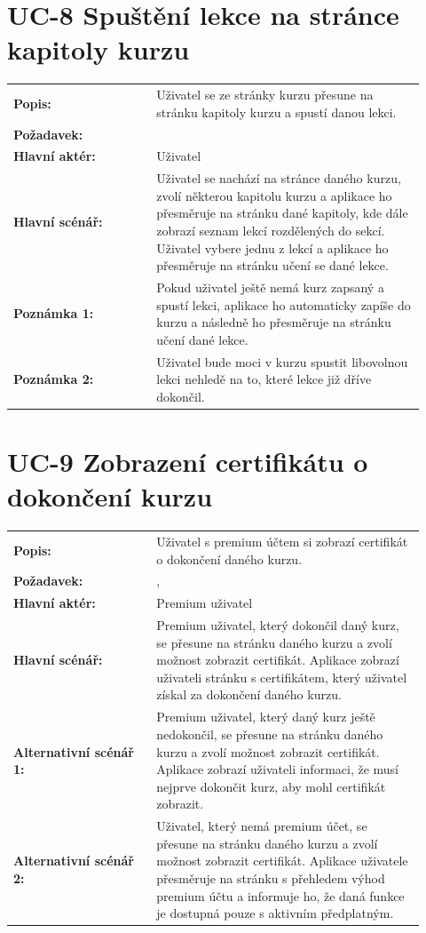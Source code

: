 \section{UC-8 Spuštění lekce na stránce kapitoly kurzu}\label{sec:uc-8}

\begin{tabular}{p{0.32\linewidth}p{0.6\linewidth}}
  \textbf{Popis:} & Uživatel se ze stránky kurzu přesune na stránku kapitoly kurzu a spustí danou lekci. \\
  \textbf{Požadavek:} & \nameref{sec:fp-course-chapter-page} \\
  \textbf{Hlavní aktér:} & Uživatel \\
  \textbf{Hlavní scénář:} & Uživatel se nachází na stránce daného kurzu, zvolí některou kapitolu kurzu a aplikace ho přesměruje na stránku dané kapitoly, kde dále zobrazí seznam lekcí rozdělených do sekcí. Uživatel vybere jednu z lekcí a aplikace ho přesměruje na stránku učení se dané lekce. \\
  \textbf{Poznámka 1:} & Pokud uživatel ještě nemá kurz zapsaný a spustí lekci, aplikace ho automaticky zapíše do kurzu a následně ho přesměruje na stránku učení dané lekce. \\
  \textbf{Poznámka 2:} & Uživatel bude moci v kurzu spustit libovolnou lekci nehledě na to, které lekce již dříve dokončil.
\end{tabular}

\section{UC-9 Zobrazení certifikátu o dokončení kurzu}\label{sec:uc-9}

\begin{tabular}{p{0.32\linewidth}p{0.6\linewidth}}
  \textbf{Popis:} & Uživatel s premium účtem si zobrazí certifikát o dokončení daného kurzu. \\
  \textbf{Požadavek:} & \nameref{sec:fp-course-certificate}, \nameref{sec:fp-subscription-system} \\
  \textbf{Hlavní aktér:} & Premium uživatel \\
  \textbf{Hlavní scénář:} & Premium uživatel, který dokončil daný kurz, se přesune na stránku daného kurzu a zvolí možnost zobrazit certifikát. Aplikace zobrazí uživateli stránku s certifikátem, který uživatel získal za dokončení daného kurzu. \\
  \textbf{Alternativní scénář 1:} & Premium uživatel, který daný kurz ještě nedokončil, se přesune na stránku daného kurzu a zvolí možnost zobrazit certifikát. Aplikace zobrazí uživateli informaci, že musí nejprve dokončit kurz, aby mohl certifikát zobrazit. \\
  \textbf{Alternativní scénář 2:} & Uživatel, který nemá premium účet, se přesune na stránku daného kurzu a zvolí možnost zobrazit certifikát. Aplikace uživatele přesměruje na stránku s přehledem výhod premium účtu a informuje ho, že daná funkce je dostupná pouze s aktivním předplatným. \\
\end{tabular}

